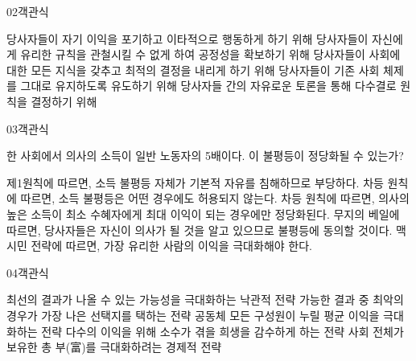 \documentclass[fs85,seriesWit]{korfarm-base}
\begin{document}
\begin{kfQBlock}{02}{객관식}
\begin{kfChoices}
\kfChoice 당사자들이 자기 이익을 포기하고 이타적으로 행동하게 하기 위해
\kfChoice 당사자들이 자신에게 유리한 규칙을 관철시킬 수 없게 하여 공정성을 확보하기 위해
\kfChoice 당사자들이 사회에 대한 모든 지식을 갖추고 최적의 결정을 내리게 하기 위해
\kfChoice 당사자들이 기존 사회 체제를 그대로 유지하도록 유도하기 위해
\kfChoice 당사자들 간의 자유로운 토론을 통해 다수결로 원칙을 결정하기 위해
\end{kfChoices}
\end{kfQBlock}

\begin{kfQBlock}{03}{객관식}
\begin{kfEvidence}한 사회에서 의사의 소득이 일반 노동자의 5배이다. 이 불평등이 정당화될 수 있는가?\end{kfEvidence}
\begin{kfChoices}
\kfChoice 제1원칙에 따르면, 소득 불평등 자체가 기본적 자유를 침해하므로 부당하다.
\kfChoice 차등 원칙에 따르면, 소득 불평등은 어떤 경우에도 허용되지 않는다.
\kfChoice 차등 원칙에 따르면, 의사의 높은 소득이 최소 수혜자에게 최대 이익이 되는 경우에만 정당화된다.
\kfChoice 무지의 베일에 따르면, 당사자들은 자신이 의사가 될 것을 알고 있으므로 불평등에 동의할 것이다.
\kfChoice 맥시민 전략에 따르면, 가장 유리한 사람의 이익을 극대화해야 한다.
\end{kfChoices}
\end{kfQBlock}

\begin{kfQBlock}{04}{객관식}
\begin{kfChoices}
\kfChoice 최선의 결과가 나올 수 있는 가능성을 극대화하는 낙관적 전략
\kfChoice 가능한 결과 중 최악의 경우가 가장 나은 선택지를 택하는 전략
\kfChoice 공동체 모든 구성원이 누릴 평균 이익을 극대화하는 전략
\kfChoice 다수의 이익을 위해 소수가 겪을 희생을 감수하게 하는 전략
\kfChoice 사회 전체가 보유한 총 부(富)를 극대화하려는 경제적 전략
\end{kfChoices}
\end{kfQBlock}

\kfEndMC
\end{document}
